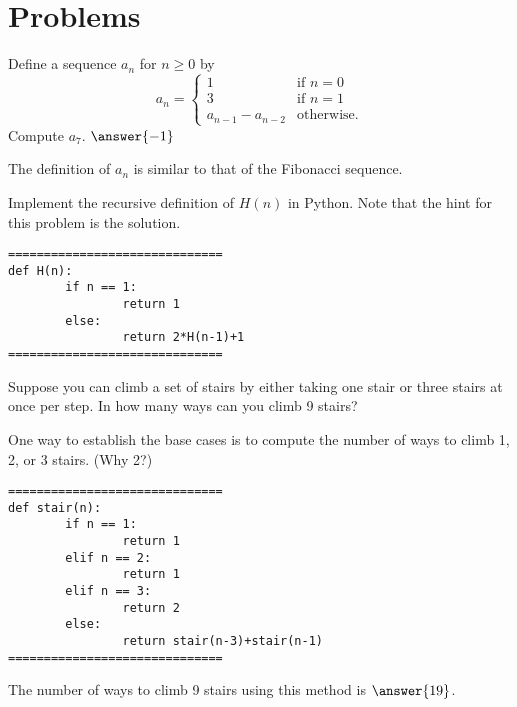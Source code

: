 \documentclass{ximera}
\begin{document}
\section{Problems}

\begin{question}
	Define a sequence $a_n$ for $n\geq 0$ by $$a_n=\begin{cases} 1 & \text{if $n=0$}\\ 3 & \text{if $n=1$}\\a_{n-1}-a_{n-2} & \text{otherwise.}\end{cases}$$ Compute $a_7$. $\answer{-1}$
	\begin{hint}
		The definition of $a_n$ is similar to that of the Fibonacci sequence.
	\end{hint}
\end{question}

\begin{question}
Implement the recursive definition of $H(n)$ in Python. Note that the hint for this problem is the solution.
	\begin{hint}
\begin{verbatim}
==============================
def H(n):
        if n == 1:
                return 1
        else:
                return 2*H(n-1)+1
==============================
\end{verbatim}
	\end{hint}
\end{question}

\begin{question}
Suppose you can climb a set of stairs by either taking one stair or three stairs at once per step. In how many ways can you climb 9 stairs?
	\begin{hint}
	One way to establish the base cases is to compute the number of ways to climb 1, 2, or 3 stairs. (Why 2?)
	\end{hint}
	\begin{hint}
\begin{verbatim}
==============================
def stair(n):
        if n == 1:
                return 1
        elif n == 2:
                return 1
        elif n == 3:
                return 2
        else:
                return stair(n-3)+stair(n-1)
==============================
\end{verbatim}
\end{hint}
The number of ways to climb 9 stairs using this method is $\answer{19}$.
\end{question}
\end{document}
